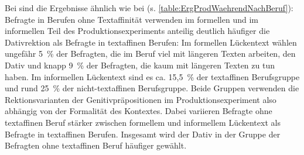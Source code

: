 Bei \waehrend{} sind die Ergebnisse ähnlich wie bei \wegen{} (s. \autoref{table:ErgProdWaehrendNachBeruf}):
Befragte in Berufen ohne Textaffinität verwenden im formellen und im informellen Teil des Produktionsexperiments anteilig deutlich häufiger die Dativrektion als Befragte in textaffinen Berufen:
Im formellen Lückentext wählen ungefähr 5~\% der Befragten, die im Beruf viel mit längeren Texten arbeiten, den Dativ und knapp 9~\% der Befragten, die kaum mit längeren Texten zu tun haben. 
Im informellen Lückentext sind es ca. 15,5~\% der textaffinen Berufsgruppe und rund 25~\% der nicht-textaffinen Berufsgruppe. 
Beide Gruppen verwenden die Rektionsvarianten der Genitivpräpositionen im Produktionsexperiment also abhängig von der Formalität des Kontextes. 
Dabei variieren Befragte ohne textaffinen Beruf stärker zwischen formellem und informellem Lückentext als Befragte in textaffinen Berufen. 
Insgesamt wird der Dativ in der Gruppe der Befragten ohne textaffinen Beruf häufiger gewählt.

